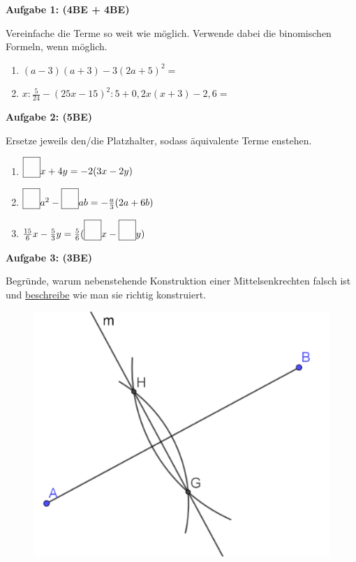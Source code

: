 \documentclass[a4paper,12pt]{article}
\newcommand{\Aufgabe}[1]{
  {
  \vspace*{0.5cm}
  \textsf{\textbf{Aufgabe #1}}
  \vspace*{0.2cm}
  
  }
}
\newcommand*{\quadratbox}{\textbf{\fbox{\phantom{\huge{?}}}}}%
\begin{document}
\vspace{1cm}

\Aufgabe{1: (4BE + 4BE)}
Vereinfache die Terme so weit wie möglich. Verwende dabei die binomischen
Formeln, wenn möglich.

\begin{enumerate}[label={\alph*)}]
  \item $(a-3)(a+3) -3(2a+5)^2=$
    \vspace{30mm}
    \newpage
\vspace*{-2cm}
  \item $x:\frac{5}{24}-(25x-15)^2:5+0,2x(x+3)-2,6=$
    \vspace{50mm}
\end{enumerate}

\Aufgabe{2: (5BE)}

Ersetze jeweils den/die Platzhalter, sodass äquivalente Terme enstehen.

\begin{enumerate}[label={\alph*)}]
  \item $\quadratbox x+4y=-2(3x-2y)$
  \item $\quadratbox a^2-\quadratbox ab = - \frac{a}{3}(2a+6b)$
  \item $\frac{15}{6}x-\frac{5}{3}y=\frac{5}{6}(\quadratbox x - \quadratbox y)$
\end{enumerate}


\Aufgabe{3: (3BE)}

\begin{minipage}[t]{0.55\textwidth}
Begründe, warum nebenstehende Konstruktion einer Mittelsenkrechten falsch ist und \underline{beschreibe} wie man sie richtig konstruiert.
\end{minipage}
\hspace*{2.05cm}
\begin{minipage}[t]{0.55\textwidth}
  \begin{figure}[H]
    \vspace{-1cm}
    \centering
    \includegraphics[width=0.7\linewidth]{7G_2SA_image1.png}
  \end{figure}
\end{minipage}
\end{document}
